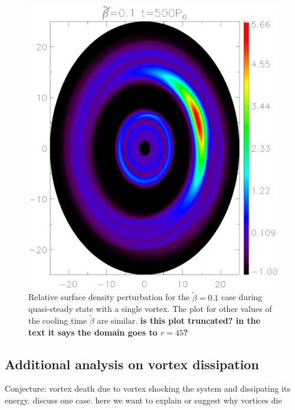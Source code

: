 \begin{figure}
  \includegraphics[width=\linewidth,height=\linewidth]{figures/vortex2D}
  \caption{Relative surface density perturbation for the
    $\tilde\beta=0.1$ case during quasi-steady state with a single
    vortex. The plot for other values of the cooling time $\tilde{\beta}$ are
    similar. {\bf is this plot truncated? in the text it says the
      domain goes to $r=45$?}
    \label{Vortex2D}} 
\end{figure}

{\bf
\subsection{Additional analysis on vortex dissipation}
Conjecture: vortex death due to vortex shocking the system and
dissipating its energy. discuss one case. here we want to explain or
suggest why vortices die} 

